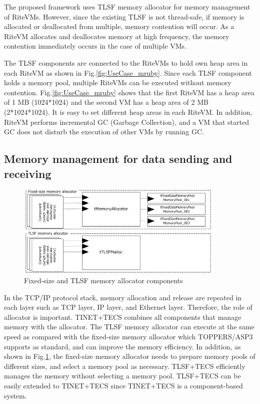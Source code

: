 \documentclass[a4j,12pt,oneside,openany,english]{jsbook}
\begin{document}
The proposed framework uses TLSF memory allocator for memory management of RiteVMs.
However, since the existing TLSF is not thread-safe, if memory is allocated or deallocated from multiple, memory contention will occur.
As a RiteVM allocates and deallocates memory at high frequency, the memory contention immediately occurs in the case of multiple VMs.

The TLSF components are connected to the RiteVMs to hold own heap area in each RiteVM as shown in Fig.\ref{fig:UseCase_mruby}.
Since each TLSF component holds a memory pool, multiple RiteVMs can be executed without memory contention.
Fig.\ref{fig:UseCase_mruby} shows that the first RiteVM has a heap area of 1 MB (1024*1024) and the second VM has a heap area of 2 MB (2*1024*1024).
It is easy to set different heap areas in each RiteVM.
In addition, RiteVM performs incremental GC (Garbage Collection), and a VM that started GC does not disturb the execution of other VMs by running GC.
    
\subsection*{Memory management for data sending and receiving}

\begin{figure}[t]
    \centering
    \includegraphics[width=10cm,clip]{figure/UseCase_TINET.pdf}
    \caption{Fixed-size and TLSF memory allocator components}
    \label{fig:UseCase_TINET}
\end{figure}

In the TCP/IP protocol stack, memory allocation and release are repeated in each layer such as TCP layer, IP layer, and Ethernet layer.
Therefore, the role of allocator is important.
TINET+TECS combines all components that manage memory with the allocator.
The TLSF memory allocator can execute at the same speed as compared with the fixed-size memory allocator which TOPPERS/ASP3 supports as standard, and can improve the memory efficiency.
In addition, as shown in Fig.\ref{fig:UseCase_TINET}, the fixed-size memory allocator needs to prepare memory pools of different sizes, and select a memory pool as necessary.
TLSF+TECS efficiently manages the memory without selecting a memory pool.
TLSF+TECS can be easily extended to TINET+TECS since TINET+TECS is a component-based system.
\end{document}
